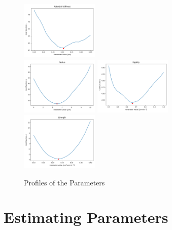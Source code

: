 \documentclass{article}
\begin{document}
\begin{figure}
    \includegraphics[width=0.33\textwidth]
        {../docs/source/_static/fitting-methods/estimate-parameters1/Potential Stiffness.png}\\
    \includegraphics[width=0.33\textwidth]
        {../docs/source/_static/fitting-methods/estimate-parameters1/Radius.png}%
    \includegraphics[width=0.33\textwidth]
        {../docs/source/_static/fitting-methods/estimate-parameters1/Rigidity.png}%
    \includegraphics[width=0.33\textwidth]
        {../docs/source/_static/fitting-methods/estimate-parameters1/Strength.png}%
    \caption{Profiles of the Parameters}
    \label{fig:parameter-estimates-single-step}
\end{figure}

\section{Estimating Parameters}
\label{section:parameter-estimation}
\end{document}
